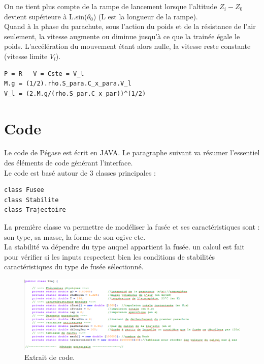 \documentclass[a4paper]{article}
\begin{document}
On ne tient plus compte de la rampe de lancement lorsque l'altitude $Z_{i} - Z_{0}$ devient supérieure à L.sin($\theta_{0}$) (L est la longueur de la rampe).\\

Quand à la phase du parachute, sous l'action du poids et de la résistance de l'air seulement, la vitesse augmente ou diminue jusqu'à ce que la trainée égale le poids. L'accélération du mouvement étant alors nulle, la vitesse reste constante (vitesse limite $V_{l}$).
\begin{verbatim}
P = R   V = Cste = V_l 
M.g = (1/2).rho.S_para.C_x_para.V_l
V_l = (2.M.g/(rho.S_par.C_x_par))^(1/2)
\end{verbatim}


\section{Code}

Le code de Pégase est écrit en JAVA. Le paragraphe suivant va résumer l'essentiel des éléments de code générant l'interface.\\

Le code est basé autour de 3 classes principales :

\begin{verbatim}
class Fusee
class Stabilite
class Trajectoire	
\end{verbatim}


La première classe va permettre de modéliser la fusée et ses caractéristiques sont : son type, sa masse, la forme de son ogive etc.\\

La stabilité va dépendre du type auquel appartient la fusée. un calcul est fait pour vérifier si les inputs respectent bien les conditions de stabilités caractéristiques du type de fusée sélectionné.\\

\newpage

\begin{figure}[!htbp]
\begin{center}
\includegraphics[width=15cm]{pictures/code.PNG} 
\end{center}
\caption{Extrait de code.}
\end{figure}
\end{document}
